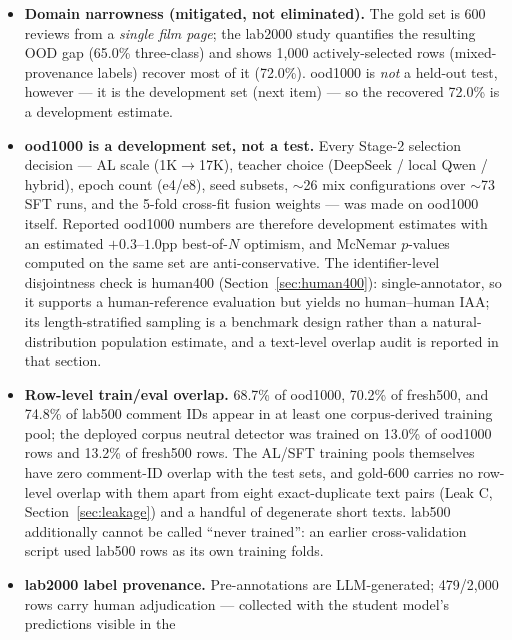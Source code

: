 \documentclass[11pt,a4paper]{article}
\begin{document}
\begin{itemize}
  \item \textbf{Domain narrowness (mitigated, not eliminated).} The
        gold set is 600 reviews from a \emph{single film page}; the
        lab2000 study quantifies the resulting OOD gap (65.0\%
        three-class) and shows 1{,}000 actively-selected rows
        (mixed-provenance labels) recover most of it (72.0\%).
        ood1000 is \emph{not} a held-out test, however --- it is the
        development set (next item) --- so the recovered 72.0\% is a
        development estimate.
  \item \textbf{ood1000 is a development set, not a test.} Every
        Stage-2 selection decision --- AL scale (1K$\to$17K), teacher
        choice (DeepSeek / local Qwen / hybrid), epoch count (e4/e8),
        seed subsets, $\sim$26 mix configurations over $\sim$73 SFT
        runs, and the 5-fold cross-fit fusion weights ---
        was made on ood1000 itself. Reported ood1000 numbers are
        therefore development estimates with an estimated
        $+0.3$--$1.0$pp best-of-$N$ optimism, and McNemar $p$-values
        computed on the same set are anti-conservative. The
        identifier-level disjointness check is human400
        (Section~\ref{sec:human400}): single-annotator, so it supports
        a human-reference evaluation but yields no human--human IAA;
        its length-stratified sampling is a benchmark design rather
        than a natural-distribution population estimate, and a
        text-level overlap audit is reported in that section.
  \item \textbf{Row-level train/eval overlap.} 68.7\% of ood1000,
        70.2\% of fresh500, and 74.8\% of lab500 comment IDs appear in
        at least one corpus-derived training pool; the deployed corpus
        neutral detector was trained on 13.0\% of ood1000 rows and
        13.2\% of fresh500 rows. The AL/SFT training pools themselves
        have zero comment-ID overlap with the test sets, and gold-600
        carries no row-level overlap with them apart from eight
        exact-duplicate text pairs (Leak C,
        Section~\ref{sec:leakage}) and a handful of degenerate short
        texts.
        lab500 additionally cannot be called ``never trained'': an
        earlier cross-validation script used lab500 rows as its own
        training folds.
  \item \textbf{lab2000 label provenance.} Pre-annotations are
        LLM-generated; 479/2{,}000 rows carry human adjudication ---
        collected with the student model's predictions visible in the

\end{itemize}
\end{document}
